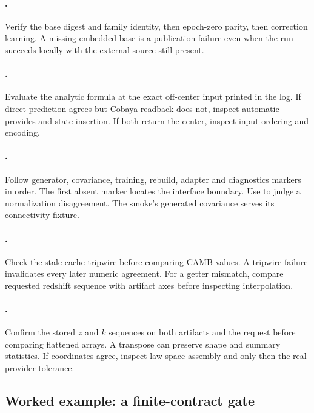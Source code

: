 \paragraph{.}
Verify the base digest and family identity, then epoch-zero parity, then
correction learning.  A missing embedded base is a publication failure even
when the run succeeds locally with the external source still present.

\paragraph{.}
Evaluate the analytic formula at the exact off-center input printed in the
log.  If direct prediction agrees but Cobaya readback does not, inspect
automatic provides and state insertion.  If both return the center, inspect
input ordering and encoding.

\paragraph{.}
Follow generator, covariance, training, rebuild, adapter and diagnostics
markers in order.  The first absent marker locates the interface boundary.
Use  to judge a normalization disagreement.  The smoke's
generated covariance serves its connectivity fixture.

\paragraph{.}
Check the stale-cache tripwire before comparing CAMB values.  A tripwire
failure invalidates every later numeric agreement.  For a getter mismatch,
compare requested redshift sequence with artifact axes before inspecting
interpolation.

\paragraph{.}
Confirm the stored \(z\) and \(k\) sequences on both artifacts and the request
before comparing flattened arrays.  A transpose can preserve shape and
summary statistics.  If coordinates agree, inspect law-space assembly and
only then the real-provider tolerance.

\subsection{Worked example: a finite-contract gate}

